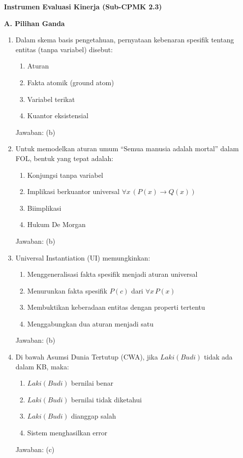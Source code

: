 \documentclass[../main]{subfiles}
\begin{document}
\begin{asesmen}
\textbf{Instrumen Evaluasi Kinerja (Sub-CPMK 2.3)}

\textbf{A. Pilihan Ganda}
\begin{enumerate}
  \item Dalam skema basis pengetahuan, pernyataan kebenaran spesifik tentang entitas (tanpa variabel) disebut:
  \begin{enumerate}
    \item Aturan
    \item Fakta atomik (ground atom)
    \item Variabel terikat
    \item Kuantor eksistensial
  \end{enumerate}
  Jawaban: (b)

  \item Untuk memodelkan aturan umum ``Semua manusia adalah mortal'' dalam FOL, bentuk yang tepat adalah:
  \begin{enumerate}
    \item Konjungsi tanpa variabel
    \item Implikasi berkuantor universal $\forall x\, (P(x) \rightarrow Q(x))$
    \item Biimplikasi
    \item Hukum De Morgan
  \end{enumerate}
  Jawaban: (b)

  \item Universal Instantiation (UI) memungkinkan:
  \begin{enumerate}
    \item Menggeneralisasi fakta spesifik menjadi aturan universal
    \item Menurunkan fakta spesifik $P(c)$ dari $\forall x\, P(x)$
    \item Membuktikan keberadaan entitas dengan properti tertentu
    \item Menggabungkan dua aturan menjadi satu
  \end{enumerate}
  Jawaban: (b)

  \item Di bawah Asumsi Dunia Tertutup (CWA), jika $Laki(Budi)$ tidak ada dalam KB, maka:
  \begin{enumerate}
    \item $Laki(Budi)$ bernilai benar
    \item $Laki(Budi)$ bernilai tidak diketahui
    \item $Laki(Budi)$ dianggap salah
    \item Sistem menghasilkan error
  \end{enumerate}
  Jawaban: (c)


\end{enumerate}
\end{asesmen}
\end{document}

